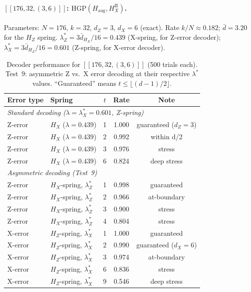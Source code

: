 \documentclass[12pt,a4paper]{article}
\theoremstyle{plain}
\theoremstyle{definition}
\theoremstyle{remark}
\begin{document}
\paragraph{$[[176,32,(3,6)]]$: $\mathrm{HGP}(H_{\mathrm{aug}},H_X^{\mathrm{II}})$.}
Parameters: $N=176$, $k=32$, $d_Z=3$, $d_X=6$ (exact).
Rate $k/N \approx 0.182$; $\bar{d}=3.20$ for the $H_Z$ spring.
$\lambda_Z^* = 3\bar{d}_{H_X}/16 = 0.439$ (X-spring, for Z-error decoder);
$\lambda_X^* = 3\bar{d}_{H_Z}/16 = 0.601$ (Z-spring, for X-error decoder).

\begin{table}[ht]
\centering
\caption{Decoder performance for $[[176,32,(3,6)]]$ (500 trials each).
  Test~9: asymmetric Z vs.\ X error decoding at their respective
  $\lambda^*$ values. ``Guaranteed'' means $t \leq \lfloor(d-1)/2\rfloor$.}
\label{tab:176_perf}
\small
\begin{tabular}{llccc}
\toprule
Error type & Spring & $t$ & Rate & Note \\
\midrule
\multicolumn{5}{l}{\textit{Standard decoding ($\lambda = \lambda_X^* = 0.601$, Z-spring)}} \\
Z-error & $H_X$ ($\lambda=0.439$) & 1 & 1.000 & guaranteed ($d_Z=3$) \\
Z-error & $H_X$ ($\lambda=0.439$) & 2 & 0.992 & within d/2 \\
Z-error & $H_X$ ($\lambda=0.439$) & 3 & 0.976 & stress \\
Z-error & $H_X$ ($\lambda=0.439$) & 6 & 0.824 & deep stress \\
\midrule
\multicolumn{5}{l}{\textit{Asymmetric decoding (Test~9)}} \\
Z-error & $H_X$-spring, $\lambda_Z^*$  & 1 & 0.998 & guaranteed \\
Z-error & $H_X$-spring, $\lambda_Z^*$  & 2 & 0.966 & at-boundary \\
Z-error & $H_X$-spring, $\lambda_Z^*$  & 3 & 0.900 & stress \\
Z-error & $H_X$-spring, $\lambda_Z^*$  & 4 & 0.804 & stress \\
X-error & $H_Z$-spring, $\lambda_X^*$  & 1 & 1.000 & guaranteed \\
X-error & $H_Z$-spring, $\lambda_X^*$  & 2 & 0.990 & guaranteed ($d_X=6$) \\
X-error & $H_Z$-spring, $\lambda_X^*$  & 3 & 0.974 & at-boundary \\
X-error & $H_Z$-spring, $\lambda_X^*$  & 6 & 0.836 & stress \\
X-error & $H_Z$-spring, $\lambda_X^*$  & 9 & 0.546 & deep stress \\
\bottomrule
\end{tabular}
\end{table}
\end{document}
